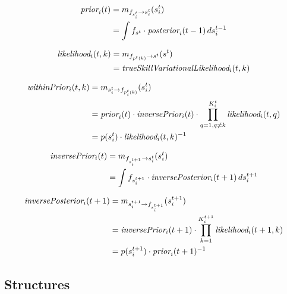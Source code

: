 \documentclass[article]{jss}
\begin{document}
 \begin{equation}
 \begin{split}
  \emph{prior}_i(t) &= m_{f_{s_i^t} \rightarrow s_i^t}(s_i^t) \\
  &= \int f_{s^t} \cdot \emph{posterior}_i(t-1) \, ds_i^{t-1}
  \end{split}
 \end{equation}

 \begin{equation}
 \begin{split}
  \emph{likelihood}_i(t,k) &= m_{f_{p^{t}(k)} \rightarrow s^t}(s^t) \\
  &= \emph{trueSkillVariationalLikelihood}_i(t,k)
  \end{split}
 \end{equation}

 \begin{equation}
 \begin{split}
 \emph{withinPrior}_i(t,k) &= m_{s_i^t \rightarrow f_{p_i^t(k)}}(s_i^t)  \\
 &= \emph{prior}_i(t) \cdot \emph{inversePrior}_i(t) \cdot \prod_{q=1, q\neq k}^{K_i^t} \emph{likelihood}_i(t,q) \\
 &= p(s_i^t) \cdot \emph{likelihood}_i(t,k)^{-1}
  \end{split}
 \end{equation}

 \begin{equation}
 \begin{split}
 \emph{inversePrior}_i(t) &= m_{f_{s_i^{t+1}} \rightarrow s_i^t}(s_i^t) \\
 &= \int f_{s_i^{t+1}} \cdot \emph{inversePosterior}_i(t+1) \, ds_i^{t+1}
 \end{split}
 \end{equation}

 \begin{equation}
 \begin{split}
 \emph{inversePosterior}_i(t+1) &= m_{s_i^{t+1} \rightarrow f_{s_i^{t+1}}}(s_i^{t+1}) \\
 &= \emph{inversePrior}_i(t+1) \cdot \prod_{k=1}^{K_i^{t+1}} \emph{likelihood}_i(t+1,k) \\
 &= p(s_i^{t+1}) \cdot \emph{prior}_i(t+1)^{-1}
 \end{split}
 \end{equation}


\subsection{Structures} \label{sec:estructuras} 
\end{document}
